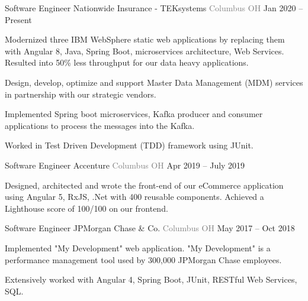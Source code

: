 \vspace{-2mm}
\begin{cventries}
    \vspace{-1mm}  \cventry
    {Software Engineer}
    {\hspace*{0.5mm}\bullet \hspace*{0.5mm} Nationwide Insurance - TEKsystems }
    {\textcolor{graytext}{Columbus OH}}
    {Jan 2020 – Present}
    {\begin{cvitems}\item {Modernized three IBM WebSphere static web applications by replacing them with Angular 8, Java, Spring Boot, microservices architecture, Web Services. Resulted into 50\% less throughput for our data heavy applications.}\item {Design, develop, optimize and support Master Data Management (MDM) services in partnership with our strategic vendors.}\item {Implemented Spring boot microservices,  Kafka producer and consumer applications to process the messages into the Kafka.  }    \item {Worked in Test Driven Development (TDD) framework using JUnit.}\end{cvitems}   \vspace{-1mm}   
    }
\cventry
    {Software Engineer}
    {\hspace*{0.5mm}\bullet \hspace*{0.5mm} Accenture}
    {\textcolor{graytext}{Columbus OH}}
    {Apr 2019 – July 2019}
    {\begin{cvitems}\item {Designed, architected and wrote the front-end of our eCommerce application using Angular 5, RxJS, .Net with 400 reusable components. Achieved a Lighthouse score of 100/100 on our frontend.}
\end{cvitems}   \vspace{-1mm}   
    }   
\cventry
    {Software Engineer}
    {\hspace*{0.5mm}\bullet \hspace*{0.5mm} JPMorgan Chase \& Co.}
    {\textcolor{graytext}{Columbus OH}}
    {May 2017 – Oct 2018}
    {\begin{cvitems}\item {Implemented "My Development" web application. "My Development" is a performance management tool used by 300,000 JPMorgan Chase employees.}\item {Extensively worked with Angular 4, Spring Boot, JUnit, RESTful Web Services, SQL.}\end{cvitems}
    }   
\end{cventries}
